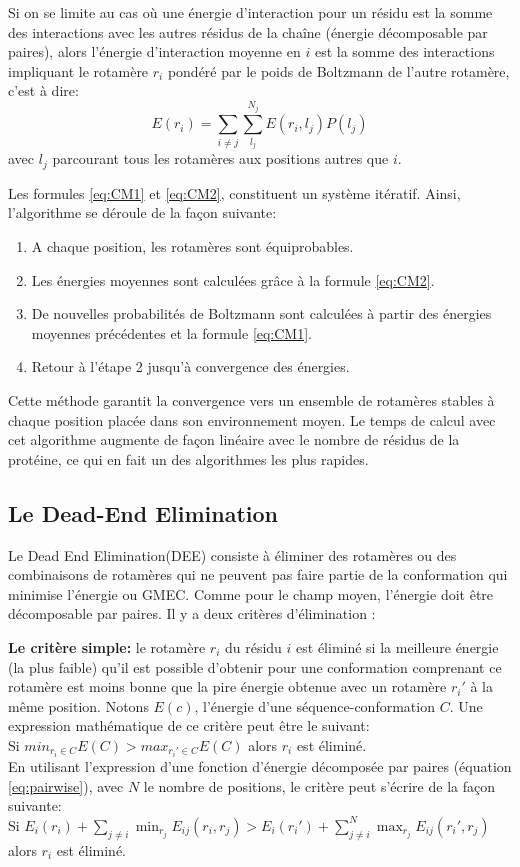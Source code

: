 Si on se limite au cas où une énergie d'interaction pour un résidu est la somme des interactions avec les autres résidus de la chaîne (énergie décomposable par paires), alors l'énergie d'interaction moyenne en $i$ est la somme des interactions impliquant le rotamère $r_i$ pondéré par le poids de Boltzmann de l'autre rotamère, c'est à dire:
\begin{equation}
    \label{eq:CM2}
E(r_i) = \sum_{i \neq j} \sum_{l_j}^{N_j} E(r_i,l_j)P(l_j)
\end{equation}  
avec $l_j$ parcourant tous les rotamères aux positions autres que $i$.

Les formules \ref{eq:CM1} et \ref{eq:CM2}, constituent un système itératif. Ainsi, l'algorithme se déroule de la façon suivante:
\begin{enumerate}[leftmargin=*]
\item  A chaque position, les rotamères sont équiprobables.
\item  Les énergies moyennes sont calculées grâce à la formule \ref{eq:CM2}.
\item  De nouvelles probabilités de Boltzmann sont calculées à partir des énergies moyennes précédentes et la formule \ref{eq:CM1}.
\item  Retour à l'étape 2 jusqu'à convergence des énergies.
\end{enumerate}
Cette méthode garantit la convergence vers un ensemble de rotamères stables à chaque position placée dans son \og environnement moyen\fg . Le temps de calcul avec cet algorithme augmente  de façon linéaire avec le nombre de résidus de la protéine, ce qui en fait un des algorithmes les plus rapides.

\subsection{Le Dead-End Elimination}
Le \og Dead End Elimination\fg (DEE)  consiste à éliminer des rotamères ou des combinaisons de rotamères qui ne peuvent pas faire partie de la conformation qui minimise l'énergie ou GMEC. Comme pour le champ moyen, l'énergie doit être décomposable par paires. Il y a deux critères d'élimination \cite{Desmet92}:

\textbf{Le critère simple:} le rotamère $r_i$ du résidu $i$ est éliminé si la meilleure énergie (la plus faible) qu'il est possible d'obtenir pour une conformation comprenant ce rotamère est moins bonne que la pire énergie obtenue avec un rotamère $r_i'$  à la même position. Notons $E(c)$, l'énergie d'une séquence-conformation $C$. Une expression mathématique de ce critère peut être le suivant:\\
Si $min_{r_i \in C }E(C) > max_{r_i' \in C} E(C) $ alors $r_i$ est éliminé. \\
En utilisant l'expression d'une fonction d'énergie décomposée par paires (équation \ref{eq:pairwise}), avec $N$ le nombre de positions, le critère peut s'écrire de la façon suivante:\\
Si $E_i(r_i) + \sum_{j\neq i} \min_{r_j} E_{ij}(r_i,r_j) > E_i(r_i') + \sum_{j\neq i}^{N} \max_{r_j}E_{ij}(r_i',r_j)$ alors $r_i$ est éliminé.\\ 

